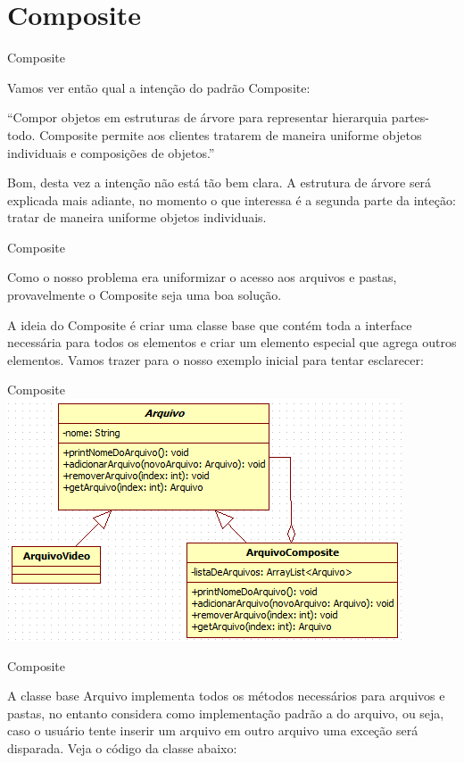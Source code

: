 \documentclass{beamer}
\begin{document}
\section{Composite}
\begin{frame}{Composite}

Vamos ver então qual a intenção do padrão Composite:

“Compor objetos em estruturas de árvore para representar hierarquia partes-todo. Composite permite aos clientes tratarem de maneira uniforme objetos individuais e composições de objetos.”

Bom, desta vez a intenção não está tão bem clara. A estrutura de árvore será explicada mais adiante, no momento o que interessa é a segunda parte da inteção: tratar de maneira uniforme objetos individuais.

\end{frame}

\begin{frame}{Composite}

Como o nosso problema era uniformizar o acesso aos arquivos e pastas, provavelmente o Composite seja uma boa solução.

A ideia do Composite é criar uma classe base que contém toda a interface necessária para todos os elementos e criar um elemento especial que agrega outros elementos. Vamos trazer para o nosso exemplo inicial para tentar esclarecer:

\end{frame}

\begin{frame}{Composite}
  \includegraphics[scale=0.8]{composite.png}
\end{frame}

\begin{frame}{Composite}

A classe base Arquivo implementa todos os métodos necessários para arquivos e pastas, no entanto considera como implementação padrão a do arquivo, ou seja, caso o usuário tente inserir um arquivo em outro arquivo uma exceção será disparada. Veja o código da classe abaixo:

\end{frame}
\end{document}
